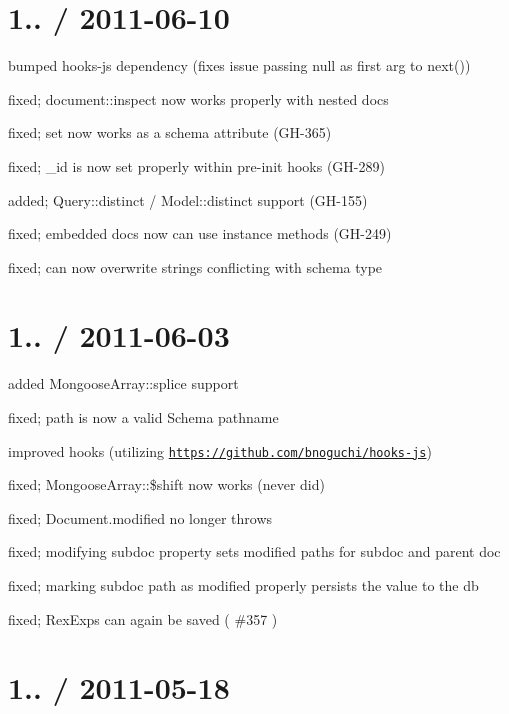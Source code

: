 \section*{1.. / 2011-\/06-\/10 }


\begin{DoxyItemize}
\item bumped hooks-\/js dependency (fixes issue passing null as first arg to next())
\item fixed; document\+::inspect now works properly with nested docs
\item fixed; \textquotesingle{}set\textquotesingle{} now works as a schema attribute (G\+H-\/365)
\item fixed; \+\_\+id is now set properly within pre-\/init hooks (G\+H-\/289)
\item added; Query\+::distinct / Model\+::distinct support (G\+H-\/155)
\item fixed; embedded docs now can use instance methods (G\+H-\/249)
\item fixed; can now overwrite strings conflicting with schema type
\end{DoxyItemize}

\section*{1.. / 2011-\/06-\/03 }


\begin{DoxyItemize}
\item added Mongoose\+Array\+::splice support
\item fixed; \textquotesingle{}path\textquotesingle{} is now a valid Schema pathname
\item improved hooks (utilizing \href{https://github.com/bnoguchi/hooks-js}{\tt https\+://github.\+com/bnoguchi/hooks-\/js})
\item fixed; Mongoose\+Array\+::\$shift now works (never did)
\item fixed; Document.\+modified no longer throws
\item fixed; modifying subdoc property sets modified paths for subdoc and parent doc
\item fixed; marking subdoc path as modified properly persists the value to the db
\item fixed; Rex\+Exps can again be saved ( \#357 )
\end{DoxyItemize}

\section*{1.. / 2011-\/05-\/18 }


